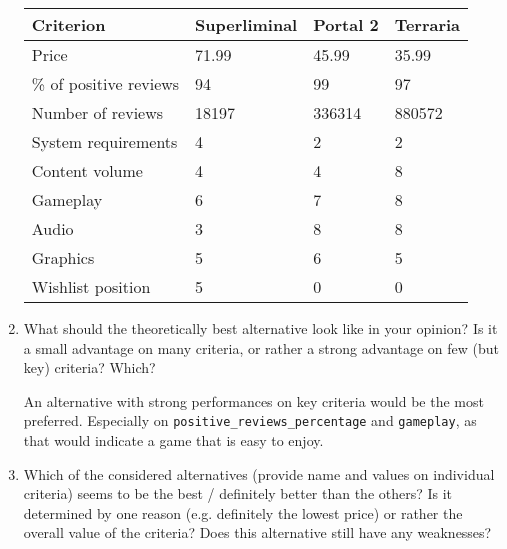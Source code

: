 \documentclass{article}
\begin{document}
\begin{enumerate}
    \begin{center}
        \begin{tabular}{ m{10em}|m{6em}|m{6em}|m{6em} }
            Criterion & Superliminal & Portal 2  & Terraria\\
            \hline
            \hline
            Price & 71.99 & 45.99 & 35.99 \\
            \% of positive reviews & 94 & 99 & 97 \\
            Number of reviews & 18197 & 336314 & 880572 \\
            System requirements & 4 & 2 & 2\\
            Content volume & 4 & 4 & 8 \\
            Gameplay & 6 & 7 & 8 \\
            Audio & 3 & 8 & 8 \\
            Graphics & 5 & 6 & 5 \\
            Wishlist position & 5 & 0 & 0 \\
        \end{tabular}
    \end{center}

    \item What should the theoretically best alternative look like in your opinion? Is it a small advantage on
    many criteria, or rather a strong advantage on few (but key) criteria? Which?

    An alternative with strong performances on key criteria would be the most preferred. Especially on \verb|positive_reviews_percentage| and \verb|gameplay|, as that would indicate a game that is easy to enjoy.

    \item Which of the considered alternatives (provide name and values on individual criteria) seems to be the
    best / definitely better than the others? Is it determined by one reason (e.g. definitely the lowest
    price) or rather the overall value of the criteria? Does this alternative still have any weaknesses?


\end{enumerate}
\end{document}
